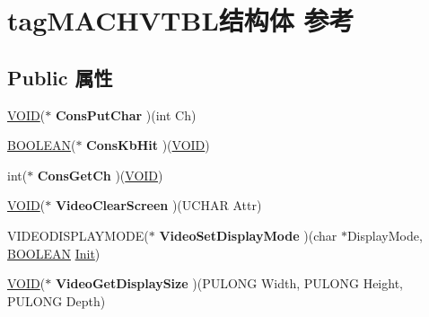 \hypertarget{structtag_m_a_c_h_v_t_b_l}{}\section{tag\+M\+A\+C\+H\+V\+T\+B\+L结构体 参考}
\label{structtag_m_a_c_h_v_t_b_l}
\subsection*{Public 属性}
\begin{DoxyCompactItemize}
\item 
\mbox{\label{structtag_m_a_c_h_v_t_b_l_afc76baa6141c7f4840949261dddc7e95}} 
\hyperlink{interfacevoid}{V\+O\+ID}($\ast$ {\bfseries Cons\+Put\+Char} )(int Ch)
\item 
\mbox{\label{structtag_m_a_c_h_v_t_b_l_a4f31d9d22ee17915707eab4a9a94a13a}} 
\hyperlink{_processor_bind_8h_a112e3146cb38b6ee95e64d85842e380a}{B\+O\+O\+L\+E\+AN}($\ast$ {\bfseries Cons\+Kb\+Hit} )(\hyperlink{interfacevoid}{V\+O\+ID})
\item 
\mbox{\label{structtag_m_a_c_h_v_t_b_l_a268676ee6034226443569394e6e19425}} 
int($\ast$ {\bfseries Cons\+Get\+Ch} )(\hyperlink{interfacevoid}{V\+O\+ID})
\item 
\mbox{\label{structtag_m_a_c_h_v_t_b_l_ab359b1619cfedada2f7e4c1833e47913}} 
\hyperlink{interfacevoid}{V\+O\+ID}($\ast$ {\bfseries Video\+Clear\+Screen} )(U\+C\+H\+AR Attr)
\item 
\mbox{\label{structtag_m_a_c_h_v_t_b_l_ac07ae42f34f5bb70a05b7d9a4d3b5c55}} 
V\+I\+D\+E\+O\+D\+I\+S\+P\+L\+A\+Y\+M\+O\+DE($\ast$ {\bfseries Video\+Set\+Display\+Mode} )(char $\ast$Display\+Mode, \hyperlink{_processor_bind_8h_a112e3146cb38b6ee95e64d85842e380a}{B\+O\+O\+L\+E\+AN} \hyperlink{class_init}{Init})
\item 
\mbox{\label{structtag_m_a_c_h_v_t_b_l_aa02c19c28cc3b0910dec4ffa8e55b2c1}} 
\hyperlink{interfacevoid}{V\+O\+ID}($\ast$ {\bfseries Video\+Get\+Display\+Size} )(P\+U\+L\+O\+NG Width, P\+U\+L\+O\+NG Height, P\+U\+L\+O\+NG Depth)
\item 

\end{DoxyCompactItemize}
